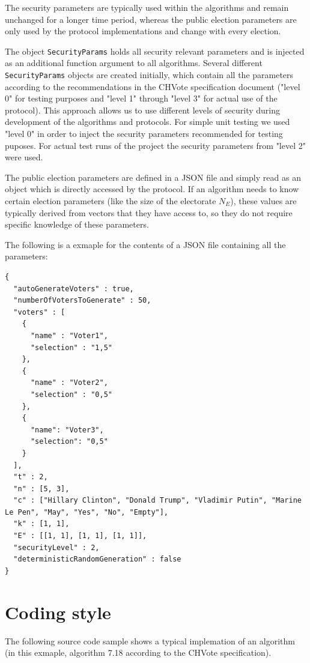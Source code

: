 \documentclass[a4paper,12pt]{report}
\begin{document}
The security parameters are typically used within the algorithms and remain unchanged for a longer time period, whereas the public election parameters are only used by the protocol implementations and change with every election.

The object \texttt{SecurityParams} holds all security relevant parameters and is injected as an additional function argument to all algorithms. Several different \texttt{SecurityParams} objects are created initially, which contain all the parameters according to the recommendations in the CHVote specification document ("level 0" for testing purposes and "level 1" through "level 3" for actual use of the protocol). This approach allows us to use different levels of security during development of the algorithms and protocols. For simple unit testing we used "level 0" in order to inject the security parameters recommended for testing puposes. For actual test runs of the project the security parameters from "level 2" were used.

The public election parameters are defined in a JSON file and simply read as an object which is directly accessed by the protocol. If an algorithm needs to know certain election parameters (like the size of the electorate $N_E$), these values are typically derived from vectors that they have access to, so they do not require specific knowledge of these parameters.

The following is a exmaple for the contents of a JSON file containing all the parameters:

\begin{verbatim}
{
  "autoGenerateVoters" : true,
  "numberOfVotersToGenerate" : 50,
  "voters" : [
    {
      "name" : "Voter1",
      "selection" : "1,5"
    },
    {
      "name" : "Voter2",
      "selection" : "0,5"
    },
    {
      "name": "Voter3",
      "selection": "0,5"
    }
  ],
  "t" : 2,
  "n" : [5, 3],
  "c" : ["Hillary Clinton", "Donald Trump", "Vladimir Putin", "Marine Le Pen", "May", "Yes", "No", "Empty"],
  "k" : [1, 1],
  "E" : [[1, 1], [1, 1], [1, 1]],
  "securityLevel" : 2,
  "deterministicRandomGeneration" : false
}
\end{verbatim}

\section{Coding style}
The following source code sample shows a typical implemation of an algorithm (in this exmaple, algorithm 7.18 according to the CHVote specification).
\end{document}
